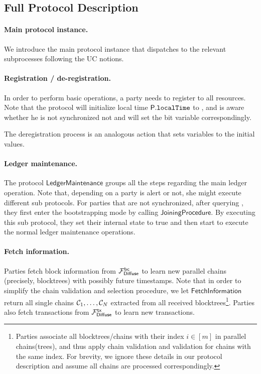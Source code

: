 \subsection{Full Protocol Description}
\label{subsec:full-protocol-description}

\paragraph{Main protocol instance.}
%
We introduce the main \pSMR protocol instance that dispatches to the relevant subprocesses following the UC notions.



\paragraph{Registration / de-registration.}
%
In order to perform basic operations, a party \party needs to register to all resources.
%
Note that the protocol will initialize local time $\mathsf{P}.\mathtt{localTime}$ to , and \party is aware whether he is not synchronized not and will set the bit variable \isSync correspondingly.



The deregistration process is an analogous action that sets variables to the initial values.



\paragraph{Ledger maintenance.}
%
The protocol $\mathsf{LedgerMaintenance}$ groups all the steps regarding the main ledger operation.
%
Note that, depending on a party is alert or not, she might execute different sub protocols.
%
For parties that are not synchronized, after querying \funcCRS, they first enter the bootstrapping mode by calling $\mathsf{JoiningProcedure}$.
%
By executing this sub protocol, they set their internal state \isSync to true and then start to execute the normal ledger maintenance operations.



\paragraph{Fetch information.}
%
Parties fetch block information from $\mathcal{F}_{\textsf{Diffuse}}^{\textsf{bc}}$ to learn new parallel chains (precisely, blocktrees) with possibly future timestamps.
%
Note that in order to simplify the chain validation and selection procedure, we let $\mathsf{FetchInformation}$ return all single chains $\mathcal{C}_1, \ldots, \mathcal{C}_N$ extracted from all received blocktrees\footnote{Parties associate all blocktrees/chains with their index $i \in [m]$ in parallel chains(trees), and thus apply chain validation and validation for chains with the same index. For brevity, we ignore these details in our protocol description and assume all chains are processed correspondingly.}.
%
Parties also fetch transactions from $\mathcal{F}_{\textsf{Diffuse}}^{\textsf{tx}}$ to learn new transactions.

